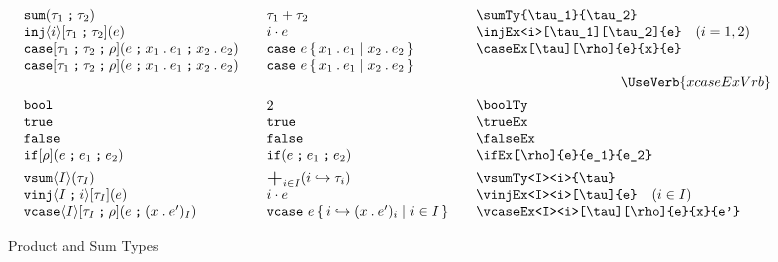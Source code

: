 \documentclass[11pt]{article}
\begin{document}
\begin{figure}
\begin{small}
\begin{displaymath}
\begin{array}{l@{\qquad}l@{\qquad}l@{\qquad}l}
        \sumTy{\tau_1}{\tau_2}            & \sumTy*{\tau_1}{\tau_2} & \verb|\sumTy{\tau_1}{\tau_2}|                     \\
        \injEx<i>[\tau_1][\tau_2]{e}      & \injEx*<i>{e}           & \verb|\injEx<i>[\tau_1][\tau_2]{e}| \quad (i=1,2) \\
        \caseEx[\tau][\rho]{e}{x}{e}     & \caseEx*{e}{x}{e}      & \verb|\caseEx[\tau][\rho]{e}{x}{e}|              \\
        \xcaseEx[\tau_1][\tau_2][\rho]{e}{x_1}{e_1}{x_2}{e_2} & \xcaseEx*{e}{x_1}{e_1}{x_2}{e_2} & \\
        \multicolumn{3}{r}{\UseVerb{xcaseExVrb}} \\[1ex]
        \boolTy                           & \boolTy*                & \verb|\boolTy|                                    \\
        \trueEx                           & \trueEx*                & \verb|\trueEx|                                    \\
        \falseEx                          & \falseEx*               & \verb|\falseEx|                                   \\
        \ifEx[\rho]{e}{e_1}{e_2}          & \ifEx*{e}{e_1}{e_2}     & \verb|\ifEx[\rho]{e}{e_1}{e_2}|                   \\[1ex]

        \vsumTy<I><i>{\tau}               & \vsumTy*<I><i>{\tau}    & \verb|\vsumTy<I><i>{\tau}|                        \\
        \vinjEx<I><i>[\tau]{e}            & \vinjEx*<I><i>{e}       & \verb|\vinjEx<I><i>[\tau]{e}| \quad (i\in I)      \\
        \vcaseEx<I><i>[\tau][\rho]{e}{x}{e'} & \vcaseEx*<I><i>{e}{x}{e'}  & \verb|\vcaseEx<I><i>[\tau][\rho]{e}{x}{e'}|
      \end{array}
    \end{displaymath}
  \end{small} 

  \caption{Product and Sum Types}
  \label{fig:prod-sum}
\end{figure}
\end{document}
